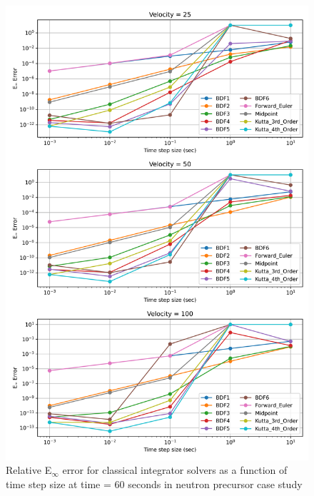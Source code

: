 \begin{figure}[p]
    \centering
    \includegraphics[width=5in]{images/chapter-5/caseStudies/neutronPrecursors/dt60/neutronPrecursorsEinfErrorerrorIntegrators.png}
    \caption{Relative E$_{\infty}$ error for classical integrator solvers as a function of time step size at time = 60 seconds in neutron precursor case study}
    \label{fig:neutron_precursors_Einf_classical_integrator}
\end{figure}

\clearpage

